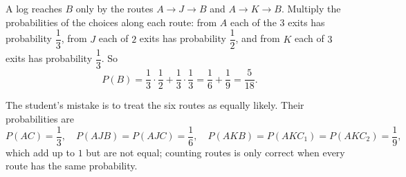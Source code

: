 A log reaches $B$ only by the routes $A\to J\to B$ and $A\to K\to B$. Multiply the probabilities of the choices along each route: from $A$ each of the $3$ exits has probability $\dfrac{1}{3}$, from $J$ each of $2$ exits has probability $\dfrac{1}{2}$, and from $K$ each of $3$ exits has probability $\dfrac{1}{3}$. So
\[
P(B)=\dfrac{1}{3}\cdot\dfrac{1}{2}+\dfrac{1}{3}\cdot\dfrac{1}{3}=\dfrac{1}{6}+\dfrac{1}{9}=\boxed{\dfrac{5}{18}}.
\]

The student's mistake is to treat the six routes as equally likely. Their probabilities are
\[
P(AC)=\dfrac{1}{3},\quad P(AJB)=P(AJC)=\dfrac{1}{6},\quad P(AKB)=P(AKC_1)=P(AKC_2)=\dfrac{1}{9},
\]
which add up to $1$ but are not equal; counting routes is only correct when every route has the same probability.
